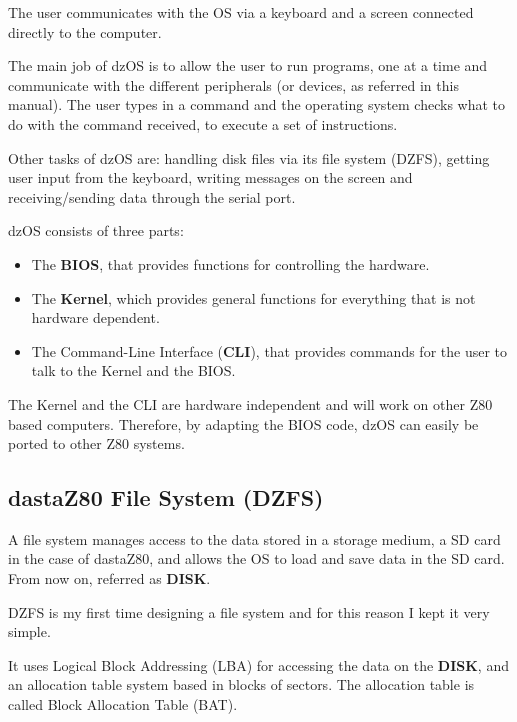 \documentclass[a4paper,11pt]{article}
\begin{document}
    The user communicates with the OS via a keyboard and a screen connected
    directly to the computer.

    The main job of dzOS is to allow the user to run programs, one at a time and
    communicate with the different peripherals (or devices, as referred in this
    manual). The user types in a command and the operating system checks what to
    do with the command received, to execute a set of instructions.

    Other tasks of dzOS are: handling disk files via its file system (DZFS),
    getting user input from the keyboard, writing messages on the screen and
    receiving/sending data through the serial port.

    dzOS consists of three parts:
    \begin{itemize}
        \item The \textbf{BIOS}, that provides functions for controlling the
        hardware.
        \item The \textbf{Kernel}, which provides general functions for
        everything that is not hardware dependent.
        \item The Command-Line Interface (\textbf{CLI}), that provides commands
        for the user to talk to the Kernel and the BIOS.
    \end{itemize}

    The Kernel and the CLI are hardware independent and will work on other Z80
    based computers. Therefore, by adapting the BIOS code, dzOS can easily be
    ported to other Z80 systems.

    \subsection{dastaZ80 File System (DZFS)}
    A file system manages access to the data stored in a storage medium, a
    SD card in the case of dastaZ80, and allows the OS to load and save data in
    the SD card. From now on, referred as \textbf{DISK}.

    DZFS is my first time designing a file system and for this reason I kept it
    very simple.

    It uses Logical Block Addressing (LBA) for accessing the data on the
    \textbf{DISK}, and an allocation table system based in blocks of sectors.
    The allocation table is called Block Allocation Table (BAT).
\end{document}
